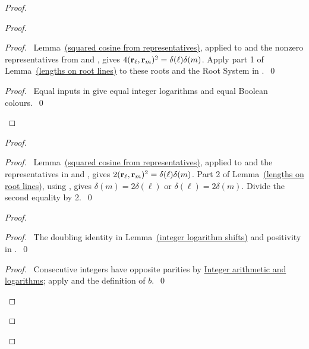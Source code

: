 \begin{mergedproofsection}
\begin{proof}
{ }
\begin{proof}
 \begin{proof}\pf\ Lemma~\hyperref[lem:312-squared-cosine]{(squared cosine from representatives)}, applied to
  and the nonzero representatives from 
 and , gives
 $4({\mathbf r}_\ell,{\mathbf r}_m)^2=\delta(\ell)\delta(m)$.
 Apply part 1 of Lemma~\hyperref[lem:312-lengths]{(lengths on root lines)} to these roots and
 the Root System in .~\qed\end{proof}
 \qedstep
 \begin{proof}\pf\ Equal inputs in 
 give equal integer logarithms and equal Boolean colours.~\qed\end{proof}
\end{proof}
\begin{proof}
 \begin{proof}\pf\ Lemma~\hyperref[lem:312-squared-cosine]{(squared cosine from representatives)}, applied to
  and the representatives in 
 and , gives
 $2({\mathbf r}_\ell,{\mathbf r}_m)^2=\delta(\ell)\delta(m)$.
 Part 2 of Lemma~\hyperref[lem:312-lengths]{(lengths on root lines)}, using ,
 gives $\delta(m)=2\delta(\ell)$ or $\delta(\ell)=2\delta(m)$.
 Divide the second equality by 2.~\qed\end{proof}
 \begin{proof}
  \begin{proof}\pf\ The doubling identity in Lemma~\hyperref[lem:312-log]{(integer logarithm shifts)}
  and positivity in .~\qed\end{proof}
  \qedstep
  \begin{proof}\pf\ Consecutive integers have opposite parities by
  \hyperref[facts:312-arithmetic]{Integer arithmetic and logarithms}; apply  and the definition of $b$.~\qed\end{proof}
 \end{proof}
\end{proof}
\end{proof}
\end{mergedproofsection}
